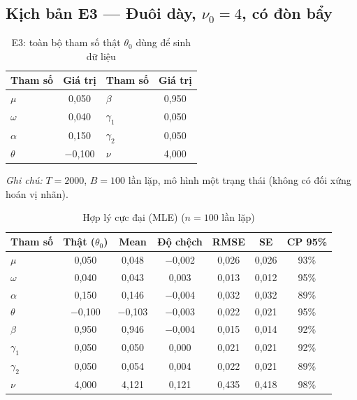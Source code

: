 \documentclass[11pt,a4paper]{article}
\begin{document}
\bigskip

\subsection*{Kịch bản E3 --- Đuôi dày, $\nu_0=4$, có đòn bẩy}
\begin{table}[H]\centering\normalsize
\caption{E3: toàn bộ tham số thật $\theta_0$ dùng để sinh dữ liệu}
\begin{tabularx}{\textwidth}{l C  l C}
\toprule
\textbf{Tham số} & \textbf{Giá trị} & \textbf{Tham số} & \textbf{Giá trị} \\
\midrule
$\mu$ & 0,050 & $\beta$ & 0,950 \\
$\omega$ & 0,040 & $\gamma_1$ & 0,050 \\
$\alpha$ & 0,150 & $\gamma_2$ & 0,050 \\
$\theta$ & $-$0,100 & $\nu$ & 4,000 \\
\bottomrule
\end{tabularx}
\vspace{0.2em}\raggedright\scriptsize \emph{Ghi chú:} $T=2000$, $B=100$ lần lặp, mô hình một trạng thái (không có đối xứng hoán vị nhãn).
\end{table}

\begin{table}[H]\centering\footnotesize
\caption{Hợp lý cực đại (MLE) ($n=100$ lần lặp)}
\begin{tabularx}{\textwidth}{l C C C C C C}
\toprule
\textbf{Tham số} & \textbf{Thật ($\theta_0$)} & \textbf{Mean} & \textbf{Độ chệch} & \textbf{RMSE} & \textbf{SE} & \textbf{CP 95\%} \\
\midrule
$\mu$ & 0,050 & 0,048 & $-$0,002 & 0,026 & 0,026 & 93\% \\
$\omega$ & 0,040 & 0,043 & 0,003 & 0,013 & 0,012 & 95\% \\
$\alpha$ & 0,150 & 0,146 & $-$0,004 & 0,032 & 0,032 & 89\% \\
$\theta$ & $-$0,100 & $-$0,103 & $-$0,003 & 0,022 & 0,021 & 95\% \\
$\beta$ & 0,950 & 0,946 & $-$0,004 & 0,015 & 0,014 & 92\% \\
$\gamma_1$ & 0,050 & 0,050 & 0,000 & 0,021 & 0,021 & 92\% \\
$\gamma_2$ & 0,050 & 0,054 & 0,004 & 0,022 & 0,021 & 89\% \\
$\nu$ & 4,000 & 4,121 & 0,121 & 0,435 & 0,418 & 98\% \\
\bottomrule
\end{tabularx}
\end{table}
\end{document}
